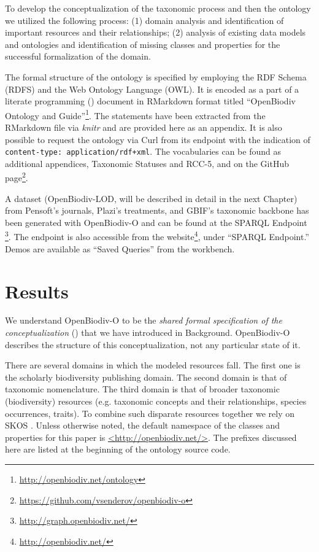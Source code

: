 To develop the conceptualization of the taxonomic process and then the ontology we utilized the following process: (1) domain analysis and identification of important resources and their relationships; (2) analysis of existing data models and ontologies and identification of missing classes and properties for the successful formalization of the domain.

The formal structure of the ontology is specified by employing the RDF Schema (RDFS) and the Web Ontology Language (OWL). It is encoded as a part of a literate programming (\cite{knuth_literate_1984}) document in RMarkdown format titled ``OpenBiodiv Ontology and Guide''\footnote{\href{http://openbiodiv.net/ontology}{http://openbiodiv.net/ontology}}. The statements have been extracted from the RMarkdown file via \emph{knitr} and are provided here as an appendix. It is also possible to request the ontology via Curl from its endpoint with the indication of {\tt content-type: application/rdf+xml}. The vocabularies can be found as additional appendices, Taxonomic Statuses and RCC-5, and on the GitHub page\footnote{\href{https://github.com/vsenderov/openbiodiv-o}{https://github.com/vsenderov/openbiodiv-o}}.

A dataset (OpenBiodiv-LOD, will be described in detail in the next Chapter) from Pensoft's journals, Plazi's treatments, and GBIF's taxonomic backbone has been generated with \mbox{OpenBiodiv-O} and can be found at the SPARQL Endpoint \footnote{\href{http://graph.openbiodiv.net/}{http://graph.openbiodiv.net/}}. The endpoint is also accessible from the website\footnote{\href{http://openbiodiv.net/}{http://openbiodiv.net/}}, under ``SPARQL Endpoint.'' Demos are available as ``Saved Queries'' from the workbench.

\section{Results}

We understand OpenBiodiv-O to be the \emph{shared formal specification of the conceptualization} (\cite{gruber_translation_1993,obitko_translations_2007,staab_handbook_2009}) that we have introduced in Background. OpenBiodiv-O describes the structure of this conceptualization, not any particular state of it.

There are several domains in which the modeled resources fall. The first one is the scholarly biodiversity publishing domain. The second domain is that of taxonomic nomenclature. The third domain is that of broader taxonomic (biodiversity) resources (e.g. taxonomic concepts and their relationships, species occurrences, traits). To combine such disparate resources together we rely on SKOS \cite{miles_skos_nodate}. Unless otherwise noted, the default namespace of the classes and properties for this paper is \url{<http://openbiodiv.net/>}. The prefixes discussed here are listed at the beginning of the ontology source code.

